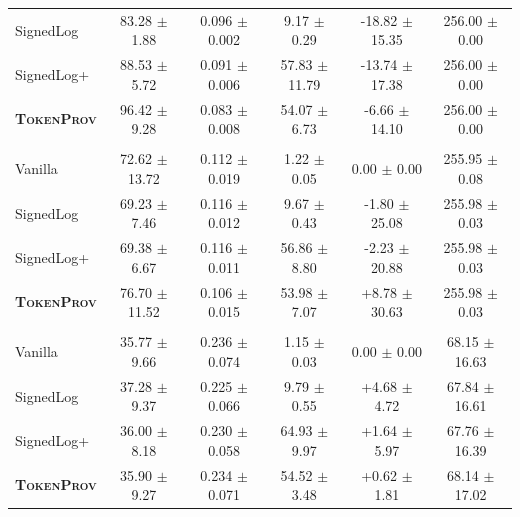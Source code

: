 \begin{table}[!t]
\begin{tabular*}{\textwidth}{@{\hspace{4pt}}l@{\extracolsep{\fill}}ccccc@{\hspace{4pt}}}
SignedLog & 83.28 $\pm$ 1.88 & 0.096 $\pm$ 0.002 & 9.17 $\pm$ 0.29 & -18.82 $\pm$ 15.35 & 256.00 $\pm$ 0.00 \\
SignedLog+ & 88.53 $\pm$ 5.72 & 0.091 $\pm$ 0.006 & 57.83 $\pm$ 11.79 & -13.74 $\pm$ 17.38 & 256.00 $\pm$ 0.00 \\
\textbf{\textsc{TokenProv}} & 96.42 $\pm$ 9.28 & 0.083 $\pm$ 0.008 & 54.07 $\pm$ 6.73 & -6.66 $\pm$ 14.10 & 256.00 $\pm$ 0.00 \\
\midrule
\rowcolor{gray!12}
\multicolumn{6}{l}{\textbf{DeepSeek-R1-Distill-Llama-8B}} \\
Vanilla & 72.62 $\pm$ 13.72 & 0.112 $\pm$ 0.019 & 1.22 $\pm$ 0.05 & 0.00 $\pm$ 0.00 & 255.95 $\pm$ 0.08 \\
SignedLog & 69.23 $\pm$ 7.46 & 0.116 $\pm$ 0.012 & 9.67 $\pm$ 0.43 & -1.80 $\pm$ 25.08 & 255.98 $\pm$ 0.03 \\
SignedLog+ & 69.38 $\pm$ 6.67 & 0.116 $\pm$ 0.011 & 56.86 $\pm$ 8.80 & -2.23 $\pm$ 20.88 & 255.98 $\pm$ 0.03 \\
\textbf{\textsc{TokenProv}} & 76.70 $\pm$ 11.52 & 0.106 $\pm$ 0.015 & 53.98 $\pm$ 7.07 & +8.78 $\pm$ 30.63 & 255.98 $\pm$ 0.03 \\
\midrule
\rowcolor{gray!12}
\multicolumn{6}{l}{\textbf{Qwen3-14B}} \\
Vanilla & 35.77 $\pm$ 9.66 & 0.236 $\pm$ 0.074 & 1.15 $\pm$ 0.03 & 0.00 $\pm$ 0.00 & 68.15 $\pm$ 16.63 \\
SignedLog & 37.28 $\pm$ 9.37 & 0.225 $\pm$ 0.066 & 9.79 $\pm$ 0.55 & +4.68 $\pm$ 4.72 & 67.84 $\pm$ 16.61 \\
SignedLog+ & 36.00 $\pm$ 8.18 & 0.230 $\pm$ 0.058 & 64.93 $\pm$ 9.97 & +1.64 $\pm$ 5.97 & 67.76 $\pm$ 16.39 \\
\textbf{\textsc{TokenProv}} & 35.90 $\pm$ 9.27 & 0.234 $\pm$ 0.071 & 54.52 $\pm$ 3.48 & +0.62 $\pm$ 1.81 & 68.14 $\pm$ 17.02 \\
\bottomrule
\end{tabular*}
\end{table}
